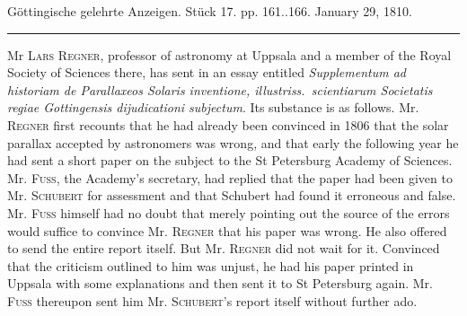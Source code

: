\clearpage
{}
\begin{center}\small Göttingische gelehrte Anzeigen. Stück 17. pp. 161..166. January 29, 1810.\\[3pt]\rule{.72\linewidth}{.3pt}\end{center}

Mr \textsc{Lars Regner}, professor of astronomy at Uppsala and a member of the Royal Society of Sciences there, has sent in an essay entitled \emph{Supplementum ad historiam de Parallaxeos Solaris inventione, illustriss.\ scientiarum Societatis regiae Gottingensis dijudicationi subjectum}. Its substance is as follows. Mr. \textsc{Regner} first recounts that he had already been convinced in 1806 that the solar parallax accepted by astronomers was wrong, and that early the following year he had sent a short paper on the subject to the St Petersburg Academy of Sciences. Mr. \textsc{Fuss}, the Academy's secretary, had replied that the paper had been given to Mr. \textsc{Schubert} for assessment and that Schubert had found it erroneous and false. Mr. \textsc{Fuss} himself had no doubt that merely pointing out the source of the errors would suffice to convince Mr. \textsc{Regner} that his paper was wrong. He also offered to send the entire report itself. But Mr. \textsc{Regner} did not wait for it. Convinced that the criticism outlined to him was unjust, he had his paper printed in Uppsala with some explanations and then sent it to St Petersburg again. Mr. \textsc{Fuss} thereupon sent him Mr. \textsc{Schubert}'s report itself without further ado.

